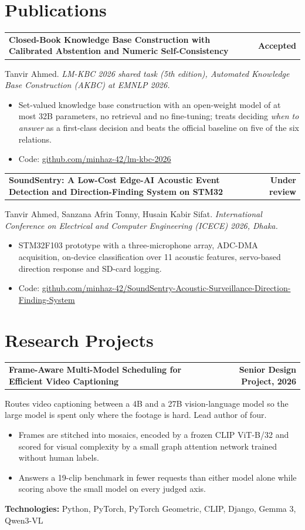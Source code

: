 \documentclass[11pt,letterpaper]{article}
\makeatletter
\newcommand{\entryhead}[2]{\par\vspace{3pt}\noindent%
  \begin{tabular*}{\textwidth}[t]{@{}>{\raggedright\arraybackslash}p{0.73\textwidth}@{\extracolsep{\fill}}r@{}}
    \textbf{#1} & #2
  \end{tabular*}\par\vspace{-1pt}}
\newcommand{\entry}[2]{\entryhead{#1}{\textbf{#2}}}
\newcommand{\tech}[1]{\par\vspace{1pt}\noindent\textbf{Technologies:} #1\par}
\newcommand{\gap}{\par\vspace{3pt}}
\makeatother
\begin{document}
\section{Publications}
\entry{Closed-Book Knowledge Base Construction with Calibrated Abstention and Numeric Self-Consistency}{Accepted}
Tanvir Ahmed. \textit{LM-KBC 2026 shared task (5th edition), Automated Knowledge Base Construction (AKBC) at EMNLP 2026.}
\begin{itemize}
  \item Set-valued knowledge base construction with an open-weight model of at most 32B parameters,
    no retrieval and no fine-tuning; treats deciding \textit{when to answer} as a first-class decision
    and beats the official baseline on five of the six relations.
  \item Code: \href{https://github.com/minhaz-42/lm-kbc-2026}{github.com/minhaz-42/lm-kbc-2026}
\end{itemize}
\gap
\entry{SoundSentry: A Low-Cost Edge-AI Acoustic Event Detection and Direction-Finding System on STM32}{Under review}
Tanvir Ahmed, Sanzana Afrin Tonny, Husain Kabir Sifat. \textit{International Conference on Electrical and Computer Engineering (ICECE) 2026, Dhaka.}
\begin{itemize}
  \item STM32F103 prototype with a three-microphone array, ADC-DMA acquisition, on-device
    classification over 11 acoustic features, servo-based direction response and SD-card logging.
  \item Code: \href{https://github.com/minhaz-42/SoundSentry-Acoustic-Surveillance-Direction-Finding-System}{github.com/minhaz-42/SoundSentry-Acoustic-Surveillance-Direction-Finding-System}
\end{itemize}

\section{Research Projects}

\entry{Frame-Aware Multi-Model Scheduling for Efficient Video Captioning}{Senior Design Project, 2026}
Routes video captioning between a 4B and a 27B vision-language model so the large model is spent
only where the footage is hard. Lead author of four.
\begin{itemize}
  \item Frames are stitched into mosaics, encoded by a frozen CLIP ViT-B/32 and scored for visual
    complexity by a small graph attention network trained without human labels.
  \item Answers a 19-clip benchmark in fewer requests than either model alone while scoring above the
    small model on every judged axis.
\end{itemize}
\tech{Python, PyTorch, PyTorch Geometric, CLIP, Django, Gemma 3, Qwen3-VL}
\gap
\end{document}
